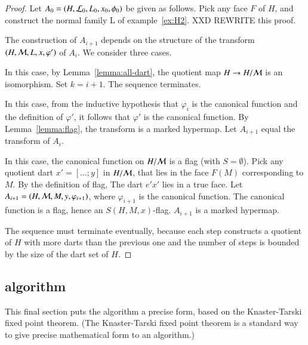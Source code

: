 \begin{proof}
Let $A_0=(H,{\cal L}_0,L_0,x_0,\phi_0)$ be given as follows.  Pick any face $F$ of $H$, and
construct the normal family {\cal L} of example~\ref{ex:H2}. 
XXD REWRITE this proof.

The construction of $A_{i+1}$ depends on the structure of the transform $(H,{\cal M},L,x,\varphi')$ of $A_i$.  We consider three
cases.
\begin{nomerate}
\item 
{}   In this case,  by
Lemma~\ref{lemma:all-dart}, the quotient map $H\to H/{\cal M}$ is an
isomorphism.  Set $k= i+1$. The sequence terminates.
\item 
{}  In this case,  from the inductive hypothesis that $\varphi_i$ is
the canonical function and the definition of $\varphi'$, it follows that $\varphi'$ is the canonical
function.  By Lemma~\ref{lemma:flag}, the transform is
a marked hypermap.  Let  $A_{i+1}$ equal the transform of $A_i$.
\item
{}
In this case, the canonical
function on $H/{\cal M}$ is a flag (with $S=\emptyset$).  Pick any quotient dart $x'=[\ldots;y]$ in $H/{\cal M}$, that
lies in the face $F(M)$ corresponding to $M$.  By the definition of flag,
The dart $e' x'$ lies in a true face.  Let
$A_{i+1} = (H,{\cal M},M,y,\varphi_{i+1})$, where $\varphi_{i+1}$ is the canonical function.
The canonical function is a flag, hence an $S(H,M,x)$-flag.  $A_{i+1}$ is a marked hypermap.
\end{nomerate}

The sequence must terminate eventually, because each step
constructs a quotient of $H$ with more darts than the previous one and
the number of steps is bounded by the size of the dart set of
$H$.
\end{proof}

\subsection{algorithm}

This final section puts the algorithm a precise form, based on
the Knaster-Tarski fixed point theorem.  (The Knaster-Tarski fixed
point theorem is a standard way to give precise mathematical form to
an algorithm.)


